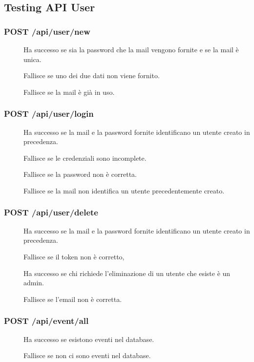 \documentclass{article}
\begin{document}
\subsection{Testing API User}
\subsubsection{POST /api/user/new}
\begin{description}
    \item[] Ha successo se sia la password che la mail vengono fornite e se la mail è unica.
    \item[] Fallisce se uno dei due dati non viene fornito.
    \item[] Fallisce se la mail è già in uso.
\end{description}
\subsubsection{POST /api/user/login}
\begin{description}
    \item[] Ha successo se la mail e la password fornite identificano un utente creato in precedenza.
    \item[] Fallisce se le credenziali sono incomplete.
    \item[] Fallisce se la password non è corretta.
    \item[] Fallisce se la mail non identifica un utente precedentemente creato.
\end{description}
\subsubsection{POST /api/user/delete}
\begin{description}
    \item[] Ha successo se la mail e la password fornite identificano un utente creato in precedenza.
    \item[] Fallisce se il token non è corretto,
    \item[] Ha successo se chi richiede l'eliminazione di un utente che esiste è un admin.
    \item[] Fallisce se l'email non è corretta.
\end{description}
\subsubsection{POST /api/event/all}
\begin{description}
    \item[] Ha successo se esistono eventi nel database.
    \item[] Fallisce se non ci sono eventi nel database.
\end{description}
\end{document}
